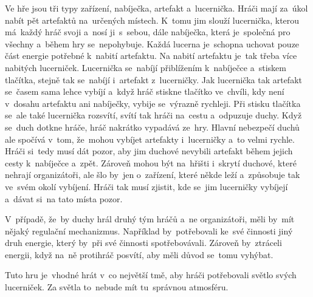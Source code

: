 Ve hře jsou tři typy zařízení, nabíječka, artefakt a~lucernička.
Hráči mají za~úkol nabít pět artefaktů na~určených místech.
K~tomu jim slouží lucernička, kterou má~každý hráč svoji a~nosí ji~s~sebou, dále nabíječka, která je~společná pro všechny a~během hry se~nepohybuje.
Každá lucerna je~schopna uchovat pouze část energie potřebné k~nabití artefaktu. 
Na nabití artefaktu je~tak třeba více nabitých lucerniček.
Lucernička se~nabíjí přiblížením k~nabíječce a~stiskem tlačítka, stejně tak se~nabíjí i~artefakt z~lucerničky.
Jak lucernička tak artefakt se~časem sama lehce vybíjí a~když hráč stiskne tlačítko ve~chvíli, kdy není v~dosahu artefaktu ani nabíječky, vybije se~výrazně rychleji.
Při stisku tlačítka se~ale také lucernička rozsvítí, svítí tak hráči na~cestu a~odpuzuje duchy.
Když se~duch dotkne hráče, hráč nakrátko vypadává ze~hry.
Hlavní nebezpečí duchů ale spočívá v~tom, že~mohou vybíjet artefakty i~lucerničky a~to velmi rychle.
Hráči si~tedy musí dát pozor, aby jim duchové nevybili artefakt během jejich cesty k~nabíječce a~zpět.
Zároveň mohou být na~hřišti i~skrytí duchové, které nehrají organizátoři, ale šlo by~jen o~zařízení, které někde leží a~způsobuje tak ve~svém okolí vybíjení.
Hráči tak musí zjistit, kde se~jim lucerničky vybíjejí a~dávat si~na tato místa pozor.

V~případě, že~by duchy hrál druhý tým hráčů a~ne organizátoři, měli by~mít nějaký regulační mechanizmus.
Například by~potřebovali ke~své činnosti jiný druh energie, který by~při své činnosti spotřebovávali.
Zároveň by~ztráceli energii, když na~ně protihráč posvítí, aby měli důvod se~tomu vyhýbat.

Tuto hru je~vhodné hrát v~co největší tmě, aby hráči potřebovali světlo svých lucerniček.
Za světla to~nebude mít tu~správnou atmosféru.
